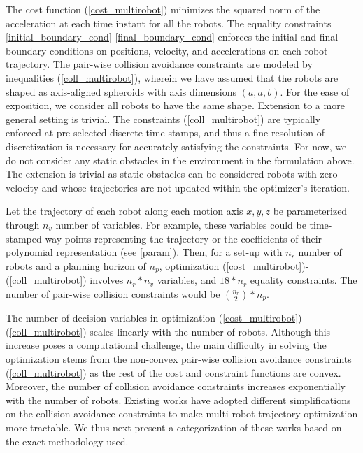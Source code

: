 \noindent The cost function (\ref{cost_multirobot}) minimizes the squared norm of the acceleration at each time instant for all the robots. The equality constraints  \eqref{initial_boundary_cond}-\eqref{final_boundary_cond} enforces the initial and final boundary conditions on positions, velocity, and accelerations on each robot trajectory. The pair-wise collision avoidance constraints are modeled by inequalities (\ref{coll_multirobot}), wherein we have assumed that the robots are shaped as axis-aligned spheroids with axis dimensions $(a, a, b)$. For the ease of exposition, we consider all robots to have the same shape. Extension to a more general setting is trivial. The constraints  (\ref{coll_multirobot})  are typically enforced at pre-selected discrete time-stamps, and thus a fine resolution of discretization is necessary for accurately satisfying the constraints. For now, we do not consider any static obstacles in the environment in the formulation above. The extension is trivial as static obstacles can be considered robots with zero velocity and whose trajectories are not updated within the optimizer's iteration.

Let the trajectory of each robot along each motion axis $x, y, z$ be parameterized through $n_v$ number of variables. For example, these variables could be time-stamped way-points representing the trajectory or the coefficients of their polynomial representation (see \eqref{param}). Then, for a set-up with $n_r$ number of robots and a planning horizon of $n_p$, optimization (\ref{cost_multirobot})-(\ref{coll_multirobot}) involves $n_r*n_v$ variables, and $18*n_r$ equality constraints. The number of pair-wise collision constraints would be ${n_r\choose{2}}*n_p$. 

The number of decision variables in optimization (\ref{cost_multirobot})-(\ref{coll_multirobot}) scales linearly with the number of robots. Although this increase poses a computational challenge, the main difficulty in solving the optimization stems from the non-convex pair-wise collision avoidance constraints (\ref{coll_multirobot}) as the rest of the cost and constraint functions are convex. Moreover, the number of collision avoidance constraints increases exponentially with the number of robots. Existing works  \citep{rafaella_scp,aks_ral21, incremental_scp_how, priority_seq, park2020efficient} have adopted different simplifications on the collision avoidance constraints to make multi-robot trajectory optimization more tractable. We thus next present a categorization of these works based on the exact methodology used.

